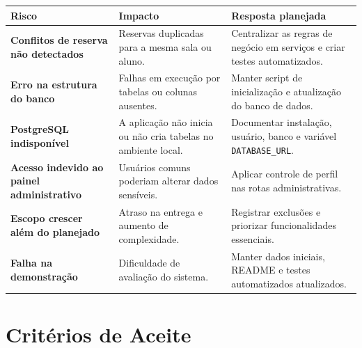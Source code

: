 \documentclass[12pt,a4paper]{article}
\begin{document}
\begin{longtable}{|p{5cm}|p{6cm}|p{4cm}|}
\hline
\textbf{Risco} & \textbf{Impacto} & \textbf{Resposta planejada} \\ \hline
\textbf{Conflitos de reserva não detectados} & Reservas duplicadas para a mesma sala ou aluno. & Centralizar as regras de negócio em serviços e criar testes automatizados. \\ \hline
\textbf{Erro na estrutura do banco} & Falhas em execução por tabelas ou colunas ausentes. & Manter script de inicialização e atualização do banco de dados. \\ \hline
\textbf{PostgreSQL indisponível} & A aplicação não inicia ou não cria tabelas no ambiente local. & Documentar instalação, usuário, banco e variável \texttt{DATABASE\_URL}. \\ \hline
\textbf{Acesso indevido ao painel administrativo} & Usuários comuns poderiam alterar dados sensíveis. & Aplicar controle de perfil nas rotas administrativas. \\ \hline
\textbf{Escopo crescer além do planejado} & Atraso na entrega e aumento de complexidade. & Registrar exclusões e priorizar funcionalidades essenciais. \\ \hline
\textbf{Falha na demonstração} & Dificuldade de avaliação do sistema. & Manter dados iniciais, README e testes automatizados atualizados. \\ \hline
\end{longtable}

\section{Critérios de Aceite}
\end{document}
